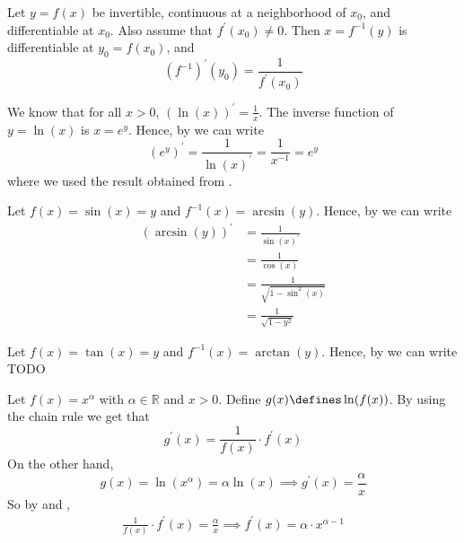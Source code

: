 \begin{thm}\label{thm-derivative-of-inverse-function}
	Let $y=f(x)$ be invertible, continuous at a neighborhood of $x_0$, and differentiable
	at $x_0$. Also assume that $f^\prime(x_0)\neq0$. Then $x=f^{-1}(y)$ is differentiable
	at $y_0=f(x_0)$, and
	\begin{equation}\label{eq-derivative-of-inverse-function}
		\left(f^{-1}\right)^\prime(y_0)=\frac{1}{f^\prime(x_0)}
	\end{equation}
\end{thm}

\begin{exm}\label{exm-derivative-of-inverse-function:1}
	We know that for all $x>0$, $(\ln(x))^\prime=\tfrac{1}{x}$. The inverse function
	of $y=\ln(x)$ is $x=e^y$. Hence, by 
	we can write
	\begin{equation*}
		(e^y)^\prime = \frac{1}{\ln(x)^\prime} = \frac{1}{x^{-1}} = e^y
	\end{equation*}
	where we used the result obtained from .
\end{exm}

\begin{exm}\label{exm-derivative-of-inverse-function:2}
	Let $f(x)=\sin(x)=y$ and $f^{-1}(x)=\arcsin(y)$. Hence, by
	 we can write
	\begin{align*}
		(\arcsin(y))^\prime & = \frac{1}{\sin(x)^\prime}     \\
		                    & = \frac{1}{\cos(x)}            \\
		                    & = \frac{1}{\sqrt{1-\sin^2(x)}} \\
		                    & = \frac{1}{\sqrt{1-y^2}}
	\end{align*}
\end{exm}

\begin{exm}\label{exm-derivative-of-inverse-function:3}
	Let $f(x)=\tan(x)=y$ and $f^{-1}(x)=\arctan(y)$. Hence, by
	 we can write TODO
\end{exm}

\begin{rem}\label{rem-first-derivative-polynomial}
	Let $f(x)=x^\alpha$ with $\alpha\in\mathbb{R}$ and $x>0$. Define
	$g(x)\defines \ln(f(x))$. By using the chain rule we get that
	\begin{equation}\label{eq-first-derivative-polynomial:1}
		g^\prime(x) = \frac{1}{f(x)} \cdot f^\prime(x)
	\end{equation}
	On the other hand,
	\begin{equation}\label{eq-first-derivative-polynomial:2}
		g(x) = \ln(x^\alpha) = \alpha\ln(x) \implies g^\prime(x) = \frac{\alpha}{x}
	\end{equation}
	So by  and ,
	\begin{align*}
		\frac{1}{f(x)} \cdot f^\prime(x) = \frac{\alpha}{x} \implies f^\prime(x) = \alpha \cdot x^{\alpha-1}
	\end{align*}
\end{rem}
